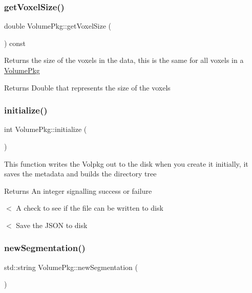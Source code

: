 \subsubsection{\texorpdfstring{get\+Voxel\+Size()}{getVoxelSize()}}
{\footnotesize\ttfamily double Volume\+Pkg\+::get\+Voxel\+Size (\begin{DoxyParamCaption}{ }\end{DoxyParamCaption}) const}

Returns the size of the voxels in the data, this is the same for all voxels in a \hyperlink{classVolumePkg}{Volume\+Pkg} \begin{DoxyReturn}{Returns}
Double that represents the size of the voxels 
\end{DoxyReturn}
\hypertarget{classVolumePkg_a1136333d9a9c3f8914cdb547336c586b}{}\label{classVolumePkg_a1136333d9a9c3f8914cdb547336c586b} 
\subsubsection{\texorpdfstring{initialize()}{initialize()}}
{\footnotesize\ttfamily int Volume\+Pkg\+::initialize (\begin{DoxyParamCaption}{ }\end{DoxyParamCaption})}

This function writes the Volpkg out to the disk when you create it initially, it saves the metadata and builds the directory tree \begin{DoxyReturn}{Returns}
An integer signalling success or failure 
\end{DoxyReturn}
$<$ A check to see if the file can be written to disk

$<$ Save the J\+S\+ON to disk \hypertarget{classVolumePkg_ae57e71436c7e3c4db73be88b49924637}{}\label{classVolumePkg_ae57e71436c7e3c4db73be88b49924637} 
\subsubsection{\texorpdfstring{new\+Segmentation()}{newSegmentation()}}
{\footnotesize\ttfamily std\+::string Volume\+Pkg\+::new\+Segmentation (\begin{DoxyParamCaption}{ }\end{DoxyParamCaption})}

